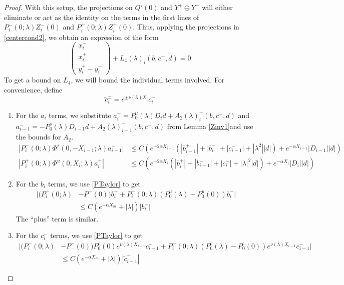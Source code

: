\documentclass[thesis.tex]{subfiles}
\begin{document}
\begin{lemma}
\begin{proof}
With this setup, the projections on $Q'(0)$ and $Y^+ \oplus Y^-$ will either eliminate or act as the identity on the terms in the first lines of $P_i^-(0; \lambda) Z_i^-(0)$ and $P_i^+(0; \lambda) Z_i^+(0)$. Thus, applying the projections in \eqref{centercond2}, we obtain an expression of the form
\begin{equation}\label{projxy}
\begin{pmatrix}x_i^- \\ x_i^+ \\ 
y_i^+ - y_i^- \end{pmatrix} + L_4(\lambda)_i(b, c^-, d) = 0
\end{equation}
To get a bound on $L_4$, we will bound the individual terms involved. For convenience, define
\[
\tilde{c}_i^\pm = e^{\pm \nu(\lambda) X_i} c_i^-
\]

\begin{enumerate}
\item For the $a_i$ terms, we substitute $a_i^+ = P_0^u(\lambda) D_i d + A_2(\lambda)_i^+(b, c^-, d)$ and $a_{i-1}^- = -P_0^s(\lambda) D_{i-1} d + A_2(\lambda)_{i-1}^-(b, c^-, d)$ from Lemma \ref{Zinv1}and use the bounds for $A_2$.
\begin{align*}
|P_i^-(0; \lambda) \Phi^s(0, -X_{i-1}; \lambda) a_{i-1}^-| 
&\leq C \left( e^{-2 \alpha X_{i-1}} (|b_{i-1}^+| + |b_i^-| + |c_{i-1}^-| + |\lambda^2||d|) + e^{- \alpha X_{i-1}} |D_{i-1}||d| \right)\\
|P_i^+(0; \lambda) \Phi^u(0, X_i; \lambda) a_i^+| 
&\leq C \left( e^{-2 \alpha X_i} (|b_i^+| + |b_{i+1}^-| + |c_i^-| + |\lambda|^2|d|) + e^{-\alpha X_i}|D_i||d| \right)
\end{align*}

\item For the $b_i$ terms, we use \eqref{PTaylor} to get
\begin{align*}
|(P_i^-(0; \lambda) &- P^-(0))b_i^- + P_i^-(0; \lambda)(P_0^u(\lambda) - P_0^u(0))b_i^-| \\
&\leq C ( e^{-\alpha X_m} + |\lambda|)|b_i^-|
\end{align*}
The ``plus'' term is similar.

\item For the $c_i^-$ terms, we use \eqref{PTaylor} to get
\begin{align*}
|(P_i^-(0; \lambda) &- P^-(0)) P_0^c(0) e^{\nu(\lambda) X_{i-1}} c_{i-1}^- + P_i^-(0; \lambda) (P_0^c(\lambda) - P_0^c(0)) e^{\nu(\lambda) X_{i-1}} c_{i-1}^- | \\
&\leq C (e^{-\alpha X_m} + |\lambda|)|\tilde{c}_{i-1}^+|
\end{align*}


\end{enumerate}
\end{proof}
\end{lemma}
\end{document}
